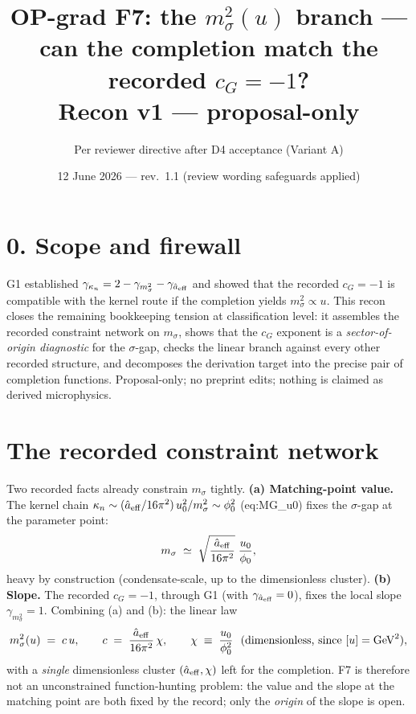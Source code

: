 \documentclass[11pt,a4paper]{article}
\title{\textbf{OP-grad F7: the $m_\sigma^2(u)$ branch --- can the completion
match the recorded $c_G=-1$?}\\\large Recon v1 --- proposal-only}
\author{Per reviewer directive after D4 acceptance (Variant A)}
\date{12 June 2026 --- rev.~1.1 (review wording safeguards applied)}
\begin{document}
\maketitle

\section*{0. Scope and firewall}
G1 established $\gamma_{\kappa_n}=2-\gamma_{m_\sigma^2}-\gamma_{\hat a_{\rm
eff}}$ and showed that the recorded $c_G=-1$ is compatible with the kernel
route if the completion yields $m_\sigma^2\propto u$. This recon closes the
remaining bookkeeping tension at classification level: it assembles the
recorded constraint network on $m_\sigma$, shows that the $c_G$ exponent is a
\emph{sector-of-origin diagnostic} for the $\sigma$-gap, checks the linear
branch against every other recorded structure, and decomposes the derivation
target into the precise pair of completion functions. Proposal-only; no
preprint edits; nothing is claimed as derived microphysics.

\section{The recorded constraint network}
Two recorded facts already constrain $m_\sigma$ tightly.
\textbf{(a) Matching-point value.} The kernel chain
$\kappa_n\sim(\hat a_{\rm eff}/16\pi^2)\,u_0^2/m_\sigma^2\sim\phi_0^2$
(eq:MG\_u0) fixes the $\sigma$-gap at the parameter point:
\[
m_\sigma\;\simeq\;\sqrt{\frac{\hat a_{\rm eff}}{16\pi^2}}\;\frac{u_0}{\phi_0},
\]
heavy by construction (condensate-scale, up to the dimensionless cluster).
\textbf{(b) Slope.} The recorded $c_G=-1$, through G1 (with
$\gamma_{\hat a_{\rm eff}}=0$), fixes the local slope $\gamma_{m_\sigma^2}=1$.
Combining (a) and (b): the linear law
\[
m_\sigma^2(u)\;=\;c\,u,\qquad
c\;=\;\frac{\hat a_{\rm eff}}{16\pi^2}\,\chi,\qquad
\chi\;\equiv\;\frac{u_0}{\phi_0^2}\ \ (\text{dimensionless, since }[u]={\rm
GeV}^2),
\]
with a \emph{single} dimensionless cluster $(\hat a_{\rm eff},\chi)$ left for
the completion. F7 is therefore not an unconstrained function-hunting
problem: the value and the slope at the matching point are both fixed by the
record; only the \emph{origin} of the slope is open.
\end{document}
